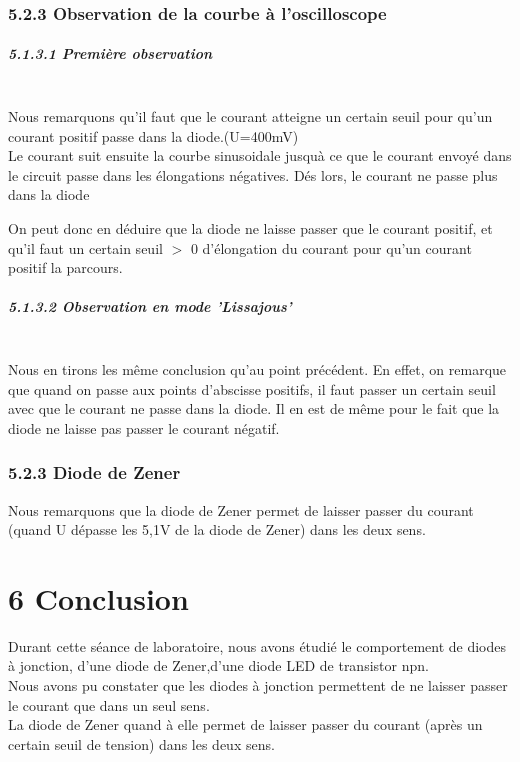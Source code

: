 \documentclass{report}
\begin{document}
\subsubsection*{5.2.3 Observation de la courbe \`a l'oscilloscope}

\subparagraph*{5.1.3.1 Premi\`ere observation} ~~\\
Nous remarquons qu'il faut que le courant atteigne un certain seuil pour qu'un courant positif passe dans
la diode.(U=400mV)\\
Le courant suit ensuite la courbe sinusoidale jusqu\`a ce que le courant envoyé dans le circuit passe dans les \'elongations n\'egatives. D\'es lors, le courant ne passe plus dans la diode

On peut donc en d\'eduire que la diode ne laisse passer que le courant positif, et qu'il faut un certain seuil $>$ 0 d'\'elongation du courant pour qu'un courant positif la parcours.

\subparagraph*{5.1.3.2 Observation en mode 'Lissajous'} ~~\\
Nous en tirons les m\^eme conclusion qu'au point pr\'ec\'edent.
En effet, on remarque que quand on passe aux points d'abscisse positifs, il faut passer un certain seuil avec que le courant ne passe dans la diode.
Il en est de même pour le fait que la diode ne laisse pas passer le courant négatif.

\subsubsection*{5.2.3 Diode de Zener}
Nous remarquons que la diode de Zener permet de laisser passer du courant (quand U dépasse les 5,1V de la diode de Zener) dans les deux sens.
\section*{6 Conclusion}

Durant cette s\'eance de laboratoire, nous avons \'etudié le comportement de diodes \`a jonction, d'une diode de Zener,d'une diode LED de transistor npn.\\

Nous avons pu constater que les diodes \`a jonction permettent de ne laisser passer le courant que dans un seul sens.\\
La diode de Zener quand à elle permet de laisser passer du courant (après un certain seuil de tension) dans les deux sens.
\end{document}

